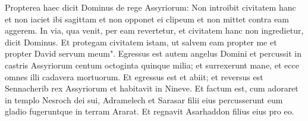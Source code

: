 \begin{biblechapter}
\verse Propterea haec dicit Dominus de rege Assyriorum: Non introibit civitatem hanc et non iaciet ibi sagittam et non opponet ei clipeum et non mittet contra eam aggerem. 
\verse In via, qua venit, per eam revertetur, et civitatem hanc non ingredietur, dicit Dominus. 
\verse Et protegam civitatem istam, ut salvem eam propter me et propter David servum meum". 
\verse Egressus est autem angelus Domini et percussit in castris Assyriorum centum octoginta quinque milia; et surrexerunt mane, et ecce omnes illi cadavera mortuorum. 
\verse Et egressus est et abiit; et reversus est Sennacherib rex Assyriorum et habitavit in Nineve. 
\verse Et factum est, cum adoraret in templo Nesroch dei sui, Adramelech et Sarasar filii eius percusserunt eum gladio fugeruntque in terram Ararat. Et regnavit Asarhaddon filius eius pro eo. 
\end{biblechapter}

